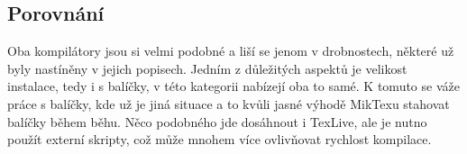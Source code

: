 \subsection{Porovnání}
Oba kompilátory jsou si velmi podobné a liší se jenom v drobnostech, některé už byly nastíněny v jejich popisech. Jedním z důležitých aspektů je velikost instalace, tedy i s balíčky, v této kategorii nabízejí oba to samé. K tomuto se váže práce s balíčky, kde už je jiná situace a to kvůli jasné výhodě MikTexu stahovat balíčky během běhu. Něco podobného jde dosáhnout i TexLive, ale je nutno použít externí skripty, což může mnohem více ovlivňovat rychlost kompilace.
